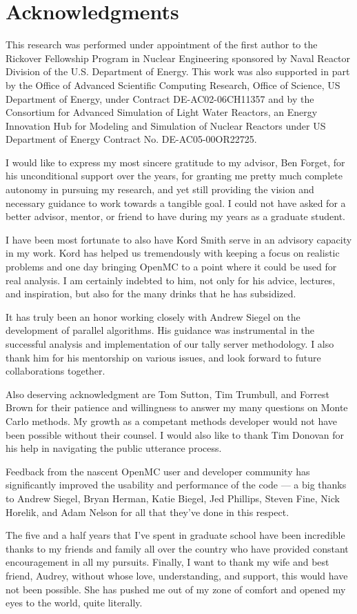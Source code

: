 \section*{Acknowledgments}

This research was performed under appointment of the first author to the
Rickover Fellowship Program in Nuclear Engineering sponsored by Naval Reactor
Division of the U.S. Department of Energy. This work was also supported in part
by the Office of Advanced Scientific Computing Research, Office of Science, US
Department of Energy, under Contract DE-AC02-06CH11357 and by the Consortium for
Advanced Simulation of Light Water Reactors, an Energy Innovation Hub for
Modeling and Simulation of Nuclear Reactors under US Department of Energy
Contract No. DE-AC05-00OR22725.

I would like to express my most sincere gratitude to my advisor, Ben Forget, for
his unconditional support over the years, for granting me pretty much complete
autonomy in pursuing my research, and yet still providing the vision and
necessary guidance to work towards a tangible goal. I could not have asked for a
better advisor, mentor, or friend to have during my years as a graduate student.

I have been most fortunate to also have Kord Smith serve in an advisory capacity
in my work. Kord has helped us tremendously with keeping a focus on realistic
problems and one day bringing OpenMC to a point where it could be used for real
analysis. I am certainly indebted to him, not only for his advice, lectures, and
inspiration, but also for the many drinks that he has subsidized.

It has truly been an honor working closely with Andrew Siegel on the development
of parallel algorithms. His guidance was instrumental in the successful analysis
and implementation of our tally server methodology. I also thank him for his
mentorship on various issues, and look forward to future collaborations
together.

Also deserving acknowledgment are Tom Sutton, Tim Trumbull, and Forrest Brown
for their patience and willingness to answer my many questions on Monte Carlo
methods. My growth as a competant methods developer would not have been possible
without their counsel. I would also like to thank Tim Donovan for his help in
navigating the public utterance process.

Feedback from the nascent OpenMC user and developer community has significantly
improved the usability and performance of the code --- a big thanks to Andrew
Siegel, Bryan Herman, Katie Biegel, Jed Phillips, Steven Fine, Nick Horelik, and
Adam Nelson for all that they've done in this respect.

The five and a half years that I've spent in graduate school have been
incredible thanks to my friends and family all over the country who have
provided constant encouragement in all my pursuits. Finally, I want to thank my
wife and best friend, Audrey, without whose love, understanding, and support,
this would have not been possible. She has pushed me out of my zone of comfort
and opened my eyes to the world, quite literally.
